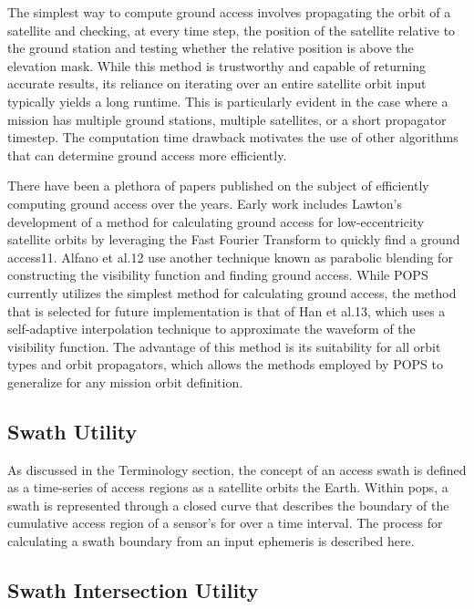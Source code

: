 The simplest way to compute ground access involves propagating the orbit of a
satellite and checking, at every time step, the position of the satellite
relative to the ground station and testing whether the relative position is
above the elevation mask. While this method is trustworthy and capable of
returning accurate results, its reliance on iterating over an entire satellite
orbit input typically yields a long runtime. This is particularly evident in
the case where a mission has multiple ground stations, multiple satellites, or
a short propagator timestep. The computation time drawback motivates the use of
other algorithms that can determine ground access more efficiently. 

There have been a plethora of papers published on the subject of efficiently
computing ground access over the years. Early work includes Lawton’s
development of a method for calculating ground access for low-eccentricity
satellite orbits by leveraging the Fast Fourier Transform to quickly find a
ground access11. Alfano et al.12 use another technique known as parabolic
blending for constructing the visibility function and finding ground access.
While POPS currently utilizes the simplest method for calculating ground
access, the method that is selected for future implementation is that of Han et
al.13, which uses a self-adaptive interpolation technique to approximate the
waveform of the visibility function. The advantage of this method is its
suitability for all orbit types and orbit propagators, which allows the methods
employed by POPS to generalize for any mission orbit definition. 


\subsection{Swath Utility} 

As discussed in the Terminology section, the concept of an access swath is
defined as a time-series of access regions as a satellite orbits the Earth.
Within \gls{pops}, a swath is represented through a closed curve that describes
the boundary of the cumulative access region of a sensor’s \gls{for} over a
time interval. The process for calculating a swath boundary from an input
ephemeris is described here. 



\subsection{Swath Intersection Utility}

